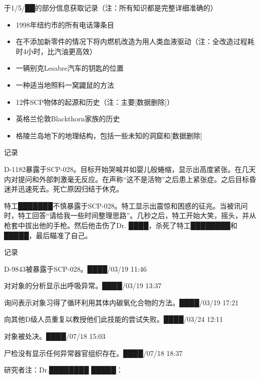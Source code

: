 于1\slash 5\slash ██的部分信息获取记录（注：所有知识都是完整详细准确的）

\begin{itemize}
\item 1998年纽约市的所有电话簿条目

\item 在不添加新零件的情况下将内燃机改造为用人类血液驱动（注：全改造过程耗时4小时，比汽油更高效）

\item 一辆别克Lesabre汽车的钥匙的位置

\item 一种适当地照料一窝鼹鼠的方法

\item 12件SCP物体的起源和历史（注：主要[数据删除]）

\item 英格兰伦敦Blackthorn家族的历史

\item 格陵兰岛地下的地理结构，包括一些未知的洞窟和[数据删除]
\end{itemize}

记录

D-1182暴露于SCP-028。目标开始哭喊并如婴儿般蜷缩，显示出高度紧张。在几天内对提问和外部刺激毫无反应。在声称“这不是活物”之后患上紧张症。之后目标昏迷并迅速死去。死亡原因归结于休克。

特工███████不慎暴露于SCP-028。特工显示出震惊和困惑的征兆。当被讯问时，特工回答“请给我一些时间整理思路”。几秒之后，特工开始大笑，摇头，并从枪套中拔出他的手枪。然后他击伤了Dr. ████，杀死了特工████████和█████，最后瞄准了自己。

记录

D-9843被暴露于SCP-028。████\slash 03\slash 19 11:46

对对象的分析显示出呼吸异常。████\slash 03\slash 19 13:37

询问表示对象习得了循环利用其体内碳氧化合物的方法。████\slash 03\slash 19 17:21

向其他D级人员重复以教授他们此技能的尝试失败。████\slash 03\slash 24 12:11

对象被处决。████\slash 07\slash 18 15:03

尸检没有显示任何异常器官组织存在。████\slash 07\slash 18 18:37

研究者注：Dr.████████ █████：
